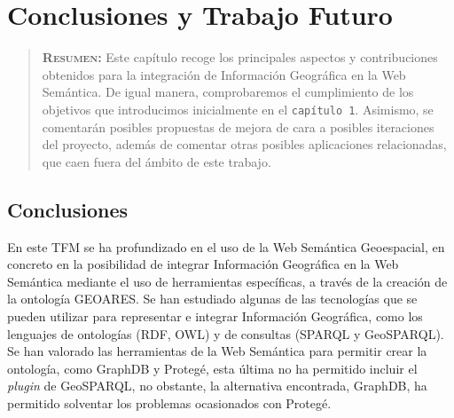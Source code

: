 

\chapter{Conclusiones y Trabajo Futuro}
\label{ch:Conclusiones y Trabajo Futuro}

\begin{quote}
  {\bf\textsc{Resumen:}} Este capítulo recoge los principales aspectos y contribuciones obtenidos para la integración de Información Geográfica en la Web Semántica. De igual manera, comprobaremos el cumplimiento de los objetivos que introducimos inicialmente en el \texttt{capítulo 1}. Asimismo, se comentarán posibles propuestas de mejora de cara a posibles iteraciones del proyecto, además de comentar otras posibles aplicaciones relacionadas, que caen fuera del ámbito de este trabajo.
\end{quote}




\section{Conclusiones}

En este TFM se ha profundizado en el uso de la Web Semántica Geoespacial, en concreto en la posibilidad de integrar Información Geográfica en la Web Semántica mediante el uso de herramientas específicas, a través de la creación de la ontología GEOARES. Se han estudiado algunas de las tecnologías que se pueden utilizar para representar e integrar Información Geográfica, como los lenguajes de ontologías (RDF, OWL) y de consultas (SPARQL y GeoSPARQL). Se han valorado las herramientas de la Web Semántica para permitir crear la ontología, como GraphDB y Protegé, esta última no ha permitido incluir el \textit{plugin} de GeoSPARQL, no obstante, la alternativa encontrada, GraphDB, ha permitido solventar los problemas ocasionados con Protegé. \\

